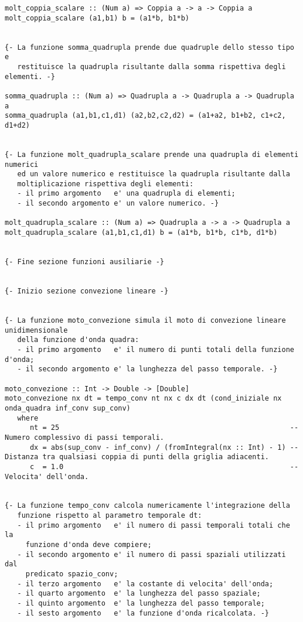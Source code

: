 \begin{verbatim}
molt_coppia_scalare :: (Num a) => Coppia a -> a -> Coppia a
molt_coppia_scalare (a1,b1) b = (a1*b, b1*b)


{- La funzione somma_quadrupla prende due quadruple dello stesso tipo e 
   restituisce la quadrupla risultante dalla somma rispettiva degli elementi. -}

somma_quadrupla :: (Num a) => Quadrupla a -> Quadrupla a -> Quadrupla a
somma_quadrupla (a1,b1,c1,d1) (a2,b2,c2,d2) = (a1+a2, b1+b2, c1+c2, d1+d2)


{- La funzione molt_quadrupla_scalare prende una quadrupla di elementi numerici
   ed un valore numerico e restituisce la quadrupla risultante dalla 
   moltiplicazione rispettiva degli elementi:
   - il primo argomento   e' una quadrupla di elementi;
   - il secondo argomento e' un valore numerico. -}

molt_quadrupla_scalare :: (Num a) => Quadrupla a -> a -> Quadrupla a
molt_quadrupla_scalare (a1,b1,c1,d1) b = (a1*b, b1*b, c1*b, d1*b)


{- Fine sezione funzioni ausiliarie -}


{- Inizio sezione convezione lineare -}


{- La funzione moto_convezione simula il moto di convezione lineare unidimensionale
   della funzione d'onda quadra:
   - il primo argomento   e' il numero di punti totali della funzione d'onda;
   - il secondo argomento e' la lunghezza del passo temporale. -}

moto_convezione :: Int -> Double -> [Double]
moto_convezione nx dt = tempo_conv nt nx c dx dt (cond_iniziale nx onda_quadra inf_conv sup_conv)
   where
      nt = 25                                                       -- Numero complessivo di passi temporali.
      dx = abs(sup_conv - inf_conv) / (fromIntegral(nx :: Int) - 1) -- Distanza tra qualsiasi coppia di punti della griglia adiacenti.
      c  = 1.0                                                      -- Velocita' dell'onda.


{- La funzione tempo_conv calcola numericamente l'integrazione della
   funzione rispetto al parametro temporale dt:
   - il primo argomento   e' il numero di passi temporali totali che la
     funzione d'onda deve compiere; 
   - il secondo argomento e' il numero di passi spaziali utilizzati dal
     predicato spazio_conv;
   - il terzo argomento   e' la costante di velocita' dell'onda;     
   - il quarto argomento  e' la lunghezza del passo spaziale;
   - il quinto argomento  e' la lunghezza del passo temporale;
   - il sesto argomento   e' la funzione d'onda ricalcolata. -}


\end{verbatim}
